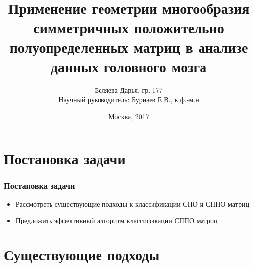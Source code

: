 \documentclass[xcolor=table]{beamer}
\begin{document}
\title[]{Применение геометрии многообразия симметричных положительно полуопределенных матриц в анализе данных головного мозга}  
\author[Дарья Беляева]{Беляева Дарья, гр. 177 \\ Научный руководитель: Бурнаев Е.В., к.ф.-м.н}
\vfill
\date{Москва, 2017} 

\frame[plain]{\titlepage} 




\section[]{Постановка задачи}
    \begin{frame}
    \frametitle{Постановка задачи}
    \begin{itemize}
        \item Рассмотреть существующие подходы к классификации СПО и СППО матриц
        \item Предложить эффективный алгоритм классификации СППО матриц
    \end{itemize}
    \end{frame}
    
\section[Существующие подходы]{Существующие подходы}
\end{document}
